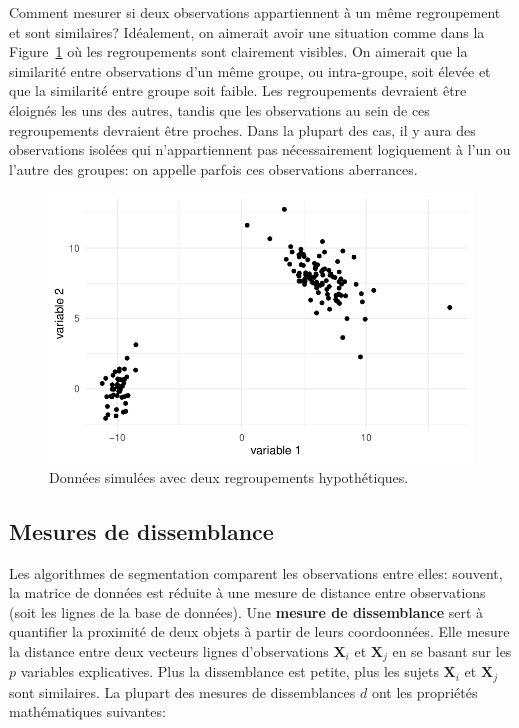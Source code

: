 \documentclass[
  11pt,
  letterpaper,
]{scrbook}
\theoremstyle{definition}
\theoremstyle{remark}
\begin{document}
Comment mesurer si deux observations appartiennent à un même
regroupement et sont similaires? Idéalement, on aimerait avoir une
situation comme dans la Figure~\ref{fig-regroupements-bidons} où les
regroupements sont clairement visibles. On aimerait que la similarité
entre observations d'un même groupe, ou intra-groupe, soit élevée et que
la similarité entre groupe soit faible. Les regroupements devraient être
éloignés les uns des autres, tandis que les observations au sein de ces
regroupements devraient être proches. Dans la plupart des cas, il y aura
des observations isolées qui n'appartiennent pas nécessairement
logiquement à l'un ou l'autre des groupes: on appelle parfois ces
observations aberrances.

\begin{figure}[ht!]

{\centering \includegraphics{regroupements_files/figure-pdf/fig-regroupements-bidons-1.pdf}

}

\caption{\label{fig-regroupements-bidons}Données simulées avec deux
regroupements hypothétiques.}

\end{figure}

\hypertarget{mesures-de-dissemblance-1}{%
\subsection{Mesures de dissemblance}\label{mesures-de-dissemblance-1}}

Les algorithmes de segmentation comparent les observations entre elles:
souvent, la matrice de données est réduite à une mesure de distance
entre observations (soit les lignes de la base de données). Une
\textbf{mesure de dissemblance} sert à quantifier la proximité de deux
objets à partir de leurs coordoonnées. Elle mesure la distance entre
deux vecteurs lignes d'observations \(\mathbf{X}_i\) et \(\mathbf{X}_j\)
en se basant sur les \(p\) variables explicatives. Plus la dissemblance
est petite, plus les sujets \(\mathbf{X}_i\) et \(\mathbf{X}_j\) sont
similaires. La plupart des mesures de dissemblances \(d\) ont les
propriétés mathématiques suivantes:
\end{document}
